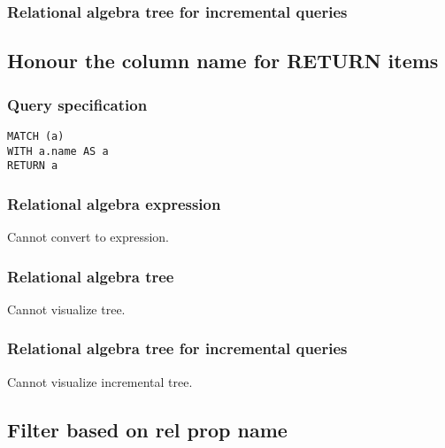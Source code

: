 \subsubsection*{Relational algebra tree for incremental queries}


\subsection{Honour the column name for RETURN items}

\subsubsection*{Query specification}

\begin{lstlisting}
MATCH (a)
WITH a.name AS a
RETURN a
\end{lstlisting}

\subsubsection*{Relational algebra expression}

Cannot convert to expression.

\subsubsection*{Relational algebra tree}

Cannot visualize tree.

\subsubsection*{Relational algebra tree for incremental queries}

Cannot visualize incremental tree.

\subsection{Filter based on rel prop name}

